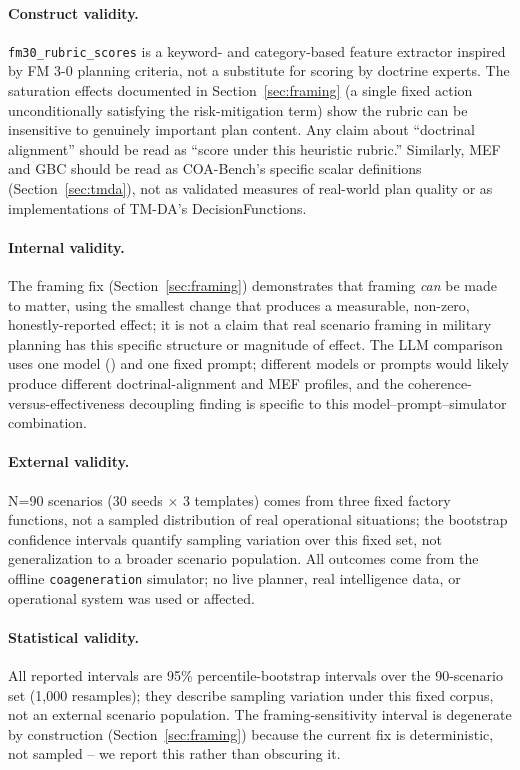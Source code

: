 \documentclass[letterpaper]{article} %
\begin{document}
\paragraph{Construct validity.} \texttt{fm30\_rubric\_scores} is a keyword- and category-based feature extractor inspired by FM 3-0 planning criteria, not a substitute for scoring by doctrine experts. The saturation effects documented in Section~\ref{sec:framing} (a single fixed action unconditionally satisfying the risk-mitigation term) show the rubric can be insensitive to genuinely important plan content. Any claim about ``doctrinal alignment'' should be read as ``score under this heuristic rubric.'' Similarly, MEF and GBC should be read as COA-Bench's specific scalar definitions (Section~\ref{sec:tmda}), not as validated measures of real-world plan quality or as implementations of TM-DA's DecisionFunctions.

\paragraph{Internal validity.} The framing fix (Section~\ref{sec:framing}) demonstrates that framing \emph{can} be made to matter, using the smallest change that produces a measurable, non-zero, honestly-reported effect; it is not a claim that real scenario framing in military planning has this specific structure or magnitude of effect. The LLM comparison uses one model () and one fixed prompt; different models or prompts would likely produce different doctrinal-alignment and MEF profiles, and the coherence-versus-effectiveness decoupling finding is specific to this model--prompt--simulator combination.

\paragraph{External validity.} N=90 scenarios (30 seeds $\times$ 3 templates) comes from three fixed factory functions, not a sampled distribution of real operational situations; the bootstrap confidence intervals quantify sampling variation over this fixed set, not generalization to a broader scenario population. All outcomes come from the offline \texttt{coageneration} simulator; no live planner, real intelligence data, or operational system was used or affected.

\paragraph{Statistical validity.} All reported intervals are 95\% percentile-bootstrap intervals over the 90-scenario set (1{,}000 resamples); they describe sampling variation under this fixed corpus, not an external scenario population. The framing-sensitivity interval is degenerate by construction (Section~\ref{sec:framing}) because the current fix is deterministic, not sampled -- we report this rather than obscuring it.
\end{document}
